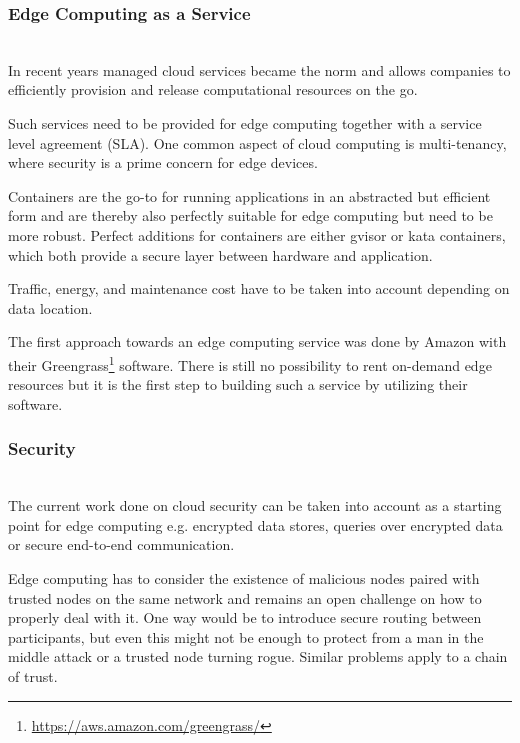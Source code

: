 \subsubsection{Edge Computing as a Service}\hspace*{\fill} \\
In recent years managed cloud services became the norm and allows companies to efficiently provision and release computational resources on the go.

Such services need to be provided for edge computing together with a service level agreement (SLA).
One common aspect of cloud computing is multi-tenancy, where security is a prime concern for edge devices.

Containers are the go-to for running applications in an abstracted but efficient form and are thereby also perfectly suitable for edge computing but need to be more robust. Perfect additions for containers are either gvisor or kata containers, which both provide a secure layer between hardware and application.

Traffic, energy, and maintenance cost have to be taken into account depending on data location.

The first approach towards an edge computing service was done by Amazon with their Greengrass\footnote{\url{https://aws.amazon.com/greengrass/}} software. There is still no possibility to rent on-demand edge resources but it is the first step to building such a service by utilizing their software.

\subsubsection{Security}\hspace*{\fill} \\
The current work done on cloud security can be taken into account as a starting point for edge computing e.g. encrypted data stores, queries over encrypted data or secure end-to-end communication.

Edge computing has to consider the existence of malicious nodes paired with trusted nodes on the same network and remains an open challenge on how to properly deal with it.
One way would be to introduce secure routing between participants, but even this might not be enough to protect from a man in the middle attack or a trusted node turning rogue. Similar problems apply to a chain of trust.

